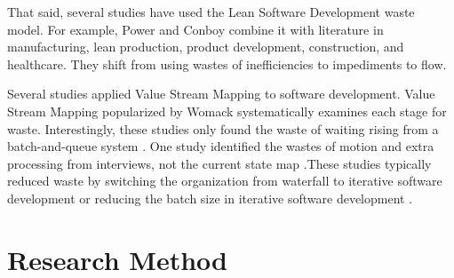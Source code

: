 That said, several studies have used the Lean Software Development waste model. For example, Power and Conboy combine it with literature in manufacturing, lean production, product development, construction, and healthcare. They shift from using wastes of inefficiencies to impediments to flow. \cite{PowerImpediments}


Several studies applied Value Stream Mapping to software development. Value Stream Mapping popularized by Womack systematically examines each stage for waste. Interestingly, these studies only found the waste of waiting rising from a batch-and-queue system \cite{Ali2016, Khurum2014, Mujtaba2010}. One study identified the wastes of motion and extra processing from interviews, not the current state map \cite{Mujtaba2010}.These studies typically reduced waste by switching the organization from waterfall to iterative software development or reducing the batch size in iterative software development \cite{Ali2016, Khurum2014, Mujtaba2010}.



\section{Research Method}
\label{ResearchMethod}

